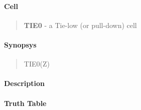 \label{TIE0}
\paragraph{Cell}
\begin{quote}
    \textbf{TIE0} - a Tie-low (or pull-down) cell 
\end{quote}

\paragraph{Synopsys}
\begin{quote}
    TIE0(Z)
\end{quote}

\paragraph{Description}

%

\paragraph{Truth Table}


